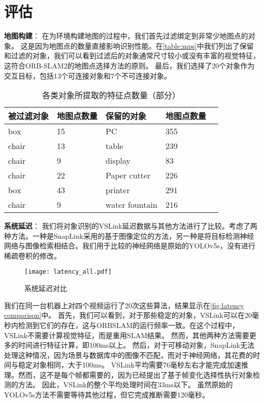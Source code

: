 \section{评估}

\textbf{地图构建}：
在为环境构建地图的过程中，我们首先过滤绑定到非常少地图点的对象。
这是因为地图点的数量直接影响识别性能。在\autoref{table:mps}中我们列出了保留和过滤的对象，我们可以看到过滤后的对象通常尺寸较小或没有丰富的视觉特征，这符合ORB-SLAM2\cite{mur2017orb}的地图点选择方法的原则。
最后，我们选择了20个对象作为交互目标，包括13个可连接对象和7个不可连接对象。

\begin{table}[htb]
	\caption{各类对象所提取的特征点数量（部分）}  \label{table:mps} 
	\begin{center}  
		\begin{tabular}{|l|l|l|l| p{4cm}|}  
			\hline  
			\textbf{被过滤对象} & \textbf{地图点数量} & \textbf{保留的对象} & \textbf{地图点数量}\\ \hline  
			box & 15 & PC & 355  \\ \hline 
			chair & 13 & table & 239  \\ \hline 
			chair & 9 & display & 83  \\ \hline  
			chair & 22 & Paper cutter & 226  \\ \hline  
			box & 43 & printer & 291  \\ \hline  
			chair & 9 & water fountain & 216  \\ \hline  
		\end{tabular}  
	\end{center}  
\end{table} 

\textbf{系统延迟}：
我们将对象识别的VSLink延迟数据与其他方法进行了比较。考虑了两种方法。一种是SnapLink\cite{chen2018snaplink}采用的基于图像定位的方法，另一种是将目标检测神经网络与图像检索相结合。我们用于比较的神经网络是原始的YOLOv5s\cite{glenn_jocher_2020_4154370}，没有进行稀疏卷积的修改。

\begin{figure}[htb]
	\centering
	\texttt{[image: latency\_all.pdf]}
	\caption{系统延迟对比}
	\label{fig:latency comparison}
\end{figure}

我们在同一台机器上对四个视频运行了20次这些算法，结果显示在\autoref{fig:latency comparison}中。
首先，我们可以看到，对于那些稳定的对象，VSLink可以在20毫秒内检测到它们的存在，这与ORBSLAM的运行频率一致。在这个过程中，VSLink不需要计算视觉特征，而是重用SLAM结果。
然而，其他两种方法需要更多的时间进行特征计算，即100ms以上。
然后，对于可移动对象，SnapLink无法处理这种情况，因为场景与数据库中的图像不匹配，而对于神经网络，其花费的时间与稳定对象相同，大于100ms。
VSLink平均需要76毫秒左右才能完成加速推理。然而，这不是每个帧都需要的，因为\cite{yao2020video}已经提出了基于帧变化选择性执行对象检测的方法。
因此，VSLink的整个平均处理时间在33ms以下。
虽然原始的YOLOv5s方法不需要等待其他过程，但它完成推断需要120毫秒。
 
